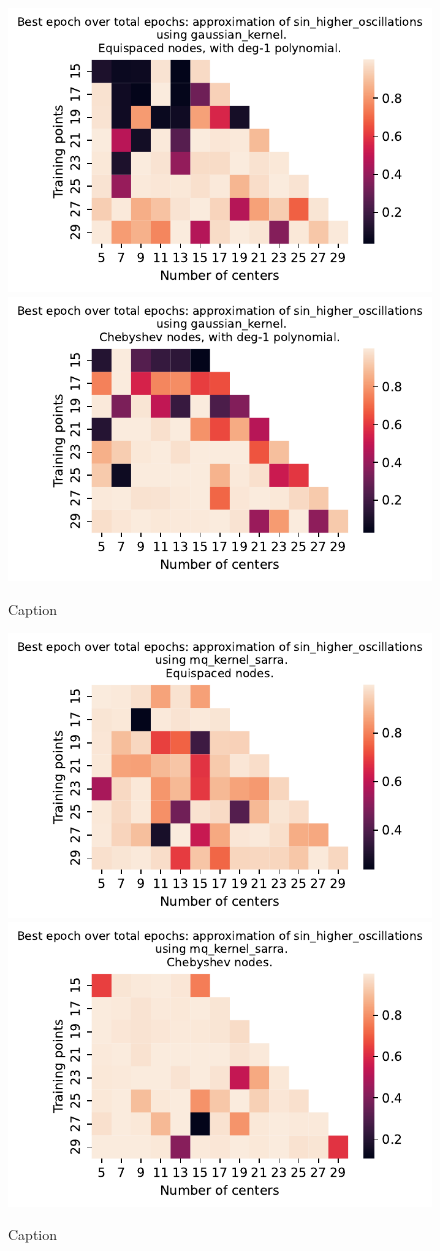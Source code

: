 \documentclass[12pt]{report} %
\begin{document}
\begin{figure}[ht]
    \centering
    
    \includegraphics[width=.49\textwidth]{imagenes/experiments/1d/variational_epochs/sin_higher_oscillations-Kgaussian_kernel-Poly-Equi-epochs.pdf}
    \includegraphics[width=.49\textwidth]{imagenes/experiments/1d/variational_epochs/sin_higher_oscillations-Kgaussian_kernel-Poly-Cheb-epochs.pdf}
    \caption{Caption}
    \label{fig:epochs-sin-higher-oscillations-gaussian-poly}
\end{figure}

\begin{figure}[ht]
    \centering
    
    \includegraphics[width=.49\textwidth]{imagenes/experiments/1d/variational_epochs/sin_higher_oscillations-Kmq_kernel_sarra-Equi-epochs.pdf}
    \includegraphics[width=.49\textwidth]{imagenes/experiments/1d/variational_epochs/sin_higher_oscillations-Kmq_kernel_sarra-Cheb-epochs.pdf}
    \caption{Caption}
    \label{fig:epochs-sin-higher-oscillations-sarra}
\end{figure}
\end{document}
